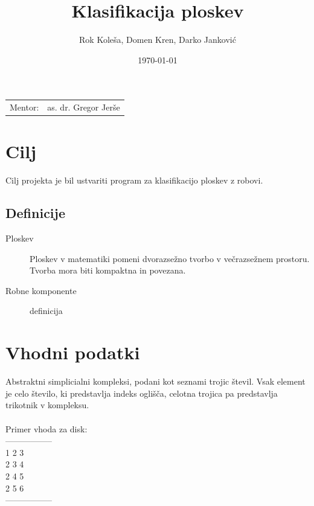\documentclass{article}
\title{Klasifikacija ploskev} %
\author{Rok Koleša, Domen Kren, Darko Janković} %
\date{\today} %
\begin{document}
\maketitle %

\begin{center}
\begin{tabular}{l r}
Mentor: & as. dr. Gregor Jerše %
\end{tabular}
\end{center}


\newpage
\tableofcontents
\newpage

\section{Cilj}
Cilj projekta je bil ustvariti program za klasifikacijo ploskev z robovi.

\subsection{Definicije}
\label{definicije}
\begin{description}
\item[Ploskev]
Ploskev v matematiki pomeni dvorazsežno tvorbo v večrazsežnem prostoru. Tvorba mora biti kompaktna in povezana.
\item[Robne komponente]
definicija
\end{description} 
 

\section{Vhodni podatki}
Abstraktni simplicialni kompleksi, podani kot seznami trojic števil. Vsak element je celo število, ki predstavlja indeks oglišča, celotna trojica pa predstavlja trikotnik v kompleksu.
\\\\
Primer vhoda za disk:  \\
-----------------  \\
1 2 3 \\
2 3 4 \\
2 4 5 \\
2 5 6 \\
-----------------  \\
\end{document}
